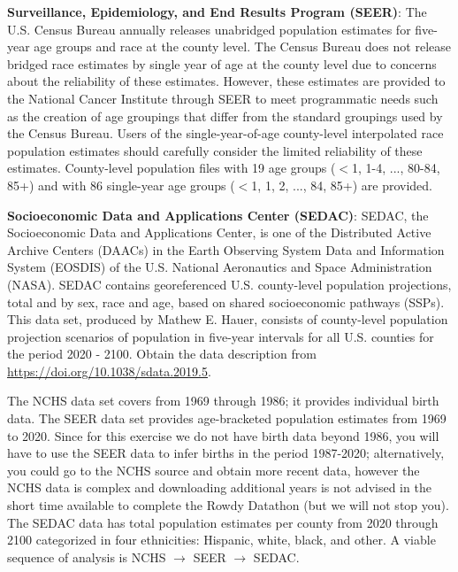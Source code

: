 \textbf{Surveillance, Epidemiology, and End Results Program (SEER)}: The U.S. Census Bureau annually releases unabridged population estimates for five-year age groups and race at the county level. The Census Bureau does not release bridged race estimates by single year of age at the county level due to concerns about the reliability of these estimates. However, these estimates are provided to the National Cancer Institute through SEER to meet programmatic needs such as the creation of age groupings that differ from the standard groupings used by the Census Bureau. Users of the single-year-of-age county-level interpolated race population estimates should carefully consider the limited reliability of these estimates. County-level population files with 19 age groups ($<$1, 1-4, ..., 80-84, 85+) and with 86 single-year age groups ($<$1, 1, 2, ..., 84, 85+) are provided.

\textbf{Socioeconomic Data and Applications Center (SEDAC)}: SEDAC, the Socioeconomic Data and Applications Center, is one of the Distributed Active Archive Centers (DAACs) in the Earth Observing System Data and Information System (EOSDIS) of the U.S. National Aeronautics and Space Administration (NASA). SEDAC contains georeferenced U.S. county-level population projections, total and by sex, race and age, based on shared socioeconomic pathways (SSPs). This data set, produced by Mathew E. Hauer, consists of county-level population projection scenarios of population in five-year intervals for all U.S. counties for the period 2020 - 2100. Obtain the data description from \href{https://doi.org/10.1038/sdata.2019.5}{https://doi.org/10.1038/sdata.2019.5}.

The NCHS data set covers from 1969 through 1986; it provides individual birth data. The SEER data set provides age-bracketed population estimates from 1969 to 2020. Since for this exercise we do not have birth data beyond 1986, you will have to use the SEER data to infer births in the period 1987-2020; alternatively, you could go to the NCHS source and obtain more recent data, however the NCHS data is complex and downloading additional years is not advised in the short time available to complete the Rowdy Datathon (but we will not stop you). The SEDAC data has total population estimates per county from 2020 through 2100 categorized in four ethnicities: Hispanic, white, black, and other. A viable sequence of analysis is NCHS $\rightarrow$ SEER $\rightarrow$ SEDAC.

